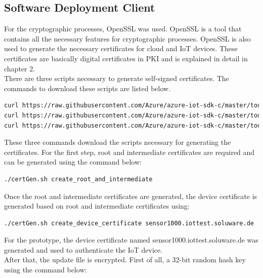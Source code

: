 \documentclass[12pt,a4paper]{article}
\begin{document}
{\subsection{Software Deployment Client}

For the cryptographic processes, OpenSSL was used. OpenSSL is a tool that contains all the necessary features for cryptographic processes. OpenSSL is also used to generate the necessary certificates for cloud and IoT devices. These certificates are basically digital certificates in PKI and is explained in detail in chapter 2. \\

There are three scripts necessary to generate self-signed certificates. The commands to download these scripts are listed below.

\begin{lstlisting}[language=bash]
curl https://raw.githubusercontent.com/Azure/azure-iot-sdk-c/master/tools/CACertificates/certGen.sh --output certGen.sh
curl https://raw.githubusercontent.com/Azure/azure-iot-sdk-c/master/tools/CACertificates/openssl_device_intermediate_ca.cnf --output openssl_device_intermediate_ca.cnf
curl https://raw.githubusercontent.com/Azure/azure-iot-sdk-c/master/tools/CACertificates/openssl_root_ca.cnf --output openssl_root_ca.cnf
\end{lstlisting}

These three commands download the scripts necessary for generating the certificates. For the first step, root  and intermediate certificates are required and can be generated using the command below:

\begin{lstlisting}[language=bash]
./certGen.sh create_root_and_intermediate 
\end{lstlisting}

Once the root and intermediate certificates are generated, the device certificate is generated based on root and intermediate certificates using:

\begin{lstlisting}[language=bash]
./certGen.sh create_device_certificate sensor1000.iottest.soluware.de
\end{lstlisting}

For the prototype, the device certificate named sensor1000.iottest.soluware.de was generated and used to authenticate the IoT device. \\

After that, the update file is encrypted. First of all, a 32-bit random hash key using the command below:

}
\end{document}
